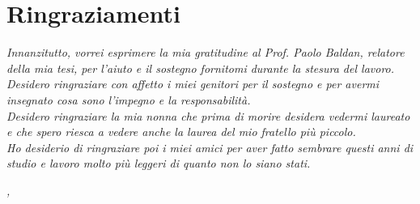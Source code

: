 
\cleardoublepage
{}
{}



\bigskip

\begingroup
\let\clearpage\relax
\let\cleardoublepage\relax
\let\cleardoublepage\relax

\chapter*{Ringraziamenti}

\noindent \textit{Innanzitutto, vorrei esprimere la mia gratitudine al Prof. Paolo Baldan, relatore della mia tesi, per l'aiuto e il sostegno fornitomi durante la stesura del lavoro.}\\
\noindent \textit{Desidero ringraziare con affetto i miei genitori per il sostegno e per avermi insegnato cosa sono l'impegno e la
responsabilità.}\\
\noindent \textit{Desidero ringraziare la mia nonna che prima di morire desidera vedermi laureato e che spero riesca a vedere anche la
laurea del mio fratello più piccolo.}\\
\noindent \textit{Ho desiderio di ringraziare poi i miei amici per aver fatto sembrare questi anni di studio e lavoro molto più leggeri di
quanto non lo siano stati.}\\
\bigskip

\noindent\textit{\myLocation, \myTime}
\hfill \myName

\endgroup

